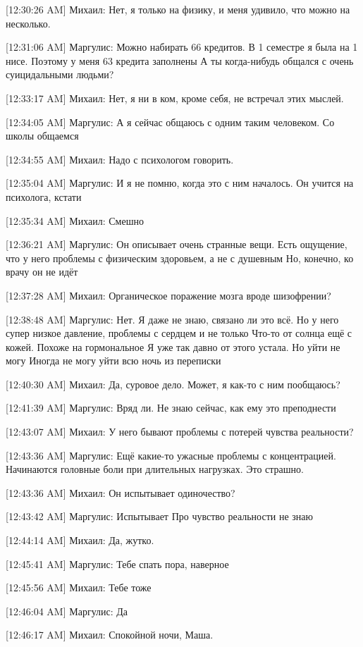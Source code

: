 \documentclass{article}
\begin{document}
[12:30:26 AM] Михаил:
Нет, я только на физику, и меня удивило, что можно на несколько.

[12:31:06 AM] Маргулис:
Можно набирать 66 кредитов. В 1 семестре я была на 1 нисе. Поэтому у меня 63 кредита заполнены
 А ты когда-нибудь общался с очень суицидальными людьми?

[12:33:17 AM] Михаил:
Нет, я ни в ком, кроме себя, не встречал этих мыслей.

[12:34:05 AM] Маргулис:
А я сейчас общаюсь с одним таким человеком. Со школы общаемся

[12:34:55 AM] Михаил:
Надо с психологом говорить.

[12:35:04 AM] Маргулис:
И я не помню, когда это с ним началось.
 Он учится на психолога, кстати

[12:35:34 AM] Михаил:
Смешно

[12:36:21 AM] Маргулис:
Он описывает очень странные вещи. Есть ощущение, что у него проблемы с физическим здоровьем, а не с душевным
 Но, конечно, ко врачу он не идёт

[12:37:28 AM] Михаил:
Органическое поражение мозга вроде шизофрении?

[12:38:48 AM] Маргулис:
Нет. Я даже не знаю, связано ли это всё. Но у него супер низкое давление, проблемы с сердцем и не только
 Что-то от солнца ещё с кожей. Похоже на гормональное
 Я уже так давно от этого устала.
 Но уйти не могу
 Иногда не могу уйти всю ночь из переписки

[12:40:30 AM] Михаил:
Да, суровое дело.
 Может, я как-то с ним пообщаюсь?

[12:41:39 AM] Маргулис:
Вряд ли. Не знаю сейчас, как ему это преподнести

[12:43:07 AM] Михаил:
У него бывают проблемы с потерей чувства реальности?

[12:43:36 AM] Маргулис:
Ещё какие-то ужасные проблемы с концентрацией. Начинаются головные боли при длительных нагрузках. Это страшно.

[12:43:36 AM] Михаил:
Он испытывает одиночество?

[12:43:42 AM] Маргулис:
Испытывает
 Про чувство реальности не знаю

[12:44:14 AM] Михаил:
Да, жутко.

[12:45:41 AM] Маргулис:
Тебе спать пора, наверное

[12:45:56 AM] Михаил:
Тебе тоже

[12:46:04 AM] Маргулис:
Да

[12:46:17 AM] Михаил:
Спокойной ночи, Маша.
\end{document}
